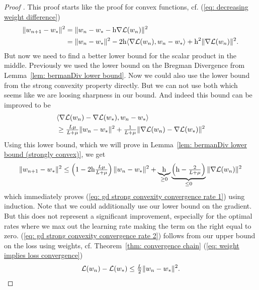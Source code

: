 \begin{proof}[Proof {\parencite[Theorem 2.1.15]{nesterovLecturesConvexOptimization2018}}]
	This proof starts like the proof for convex functions, cf. (\ref{eq:
	decreasing weight difference})
 \begin{align*}
		\|w_{n+1} - w_*\|^2
		&= \| w_n -w_* - \text{h}\nabla\mathcal{L}(w_n)\|^2\\
		&= \| w_n - w_*\|^2
		- 2\text{h}\langle \nabla\mathcal{L}(w_n), w_n - w_*\rangle
		+ \text{h}^2 \| \nabla\mathcal{L}(w_n)\|^2.
	\end{align*}
	But now we need to find a better lower bound for the scalar product in the
	middle. Previously we used the lower bound on the Bregman Divergence from
	Lemma~\ref{lem: bermanDiv lower bound}. Now we could also use the lower bound
	from the strong convexity property directly. But we can not use both which
	seems like we are loosing sharpness in our bound. And indeed this bound can
	be improved to be
 	\begin{align*}
		&\langle \nabla\mathcal{L}(w_n) -\nabla\mathcal{L}(w_*), w_n - w_*\rangle	\\
		&\ge \tfrac{L\mu}{L+\mu}\|w_n - w_*\|^2
		+ \tfrac{1}{L+\mu}
		\|\nabla\mathcal{L}(w_n) - \nabla\mathcal{L}(w_*)\|^2
	\end{align*}
	Using this lower bound, which we will prove in Lemma~\ref{lem: bermanDiv
	lower bound (strongly convex)}, we get
 \begin{align*}
		\|w_{n+1} - w_*\|^2
		\le \left(1- 2\text{h} \tfrac{L\mu}{L+\mu}\right)
		\|w_n - w_*\|^2
		+ \underbrace{\text{h}}_{\ge 0}
		\underbrace{\left(\text{h}-\tfrac{2}{L+\mu}\right)}_{\le0}
		\|\nabla\mathcal{L}(w_n)\|^2
	\end{align*}
	which immediately proves (\ref{eq: gd strong convexity convergence rate
	1}) using induction. Note that we could additionally use our lower bound on the
	gradient. But this does not represent a significant improvement,
	especially for the optimal rates where we max out the learning rate making
	the term on the right equal to zero. (\ref{eq: gd strong convexity
	convergence rate 2}) follows from our upper bound on the loss using weights,
	cf. Theorem~\ref{thm: convergence chain} (\ref{eq: weight implies loss convergence})
	\begin{align*}
		\mathcal{L}(w_n) - \mathcal{L}(w_*)
		\le \tfrac{L}{2} \| w_n - w_*\|^2.
	\end{align*}

\end{proof}
